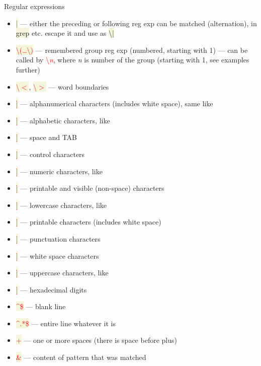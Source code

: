 \documentclass[compress, xelatex, 11pt, xcolor=svgnames, aspectratio=169, url={hyphens, lowtilde}]{beamer}
\renewcommand{\texttt}[1]{\colorbox{Beige}{{\ttfamily #1}}}
\renewcommand{\alert}[1]{\textcolor{red}{#1}}
\begin{document}
\begin{frame}[allowframebreaks]{Regular expressions}
\begin{itemize}
		\item \alert{\texttt{|}} --- either the preceding or following reg exp can be matched (alternation), in \texttt{grep} etc. escape it and use as \texttt{\textbackslash |}
		\item \alert{\texttt{\textbackslash(\ldots\textbackslash)}} --- remembered group reg exp (numbered, starting with 1) --- can be called by \alert{\textbackslash\textit{n}}, where \textit{n} is number of the group (starting with 1, see examples further)
		\item \alert{\texttt{\textbackslash$<$}}, \alert{\texttt{\textbackslash$>$}} --- word boundaries
		\item \alert{\texttt{[[:alnum:]]}} --- alphanumerical characters (includes white space), same like \texttt{[a-zA-Z0-9]}
		\item \alert{\texttt{[[:alpha:]]}} --- alphabetic characters, like \texttt{[a-zA-Z]}
		\item \alert{\texttt{[[:blank:]]}} --- space and TAB
		\item \alert{\texttt{[[:cntrl:]]}} --- control characters
		\item \alert{\texttt{[[:digit:]]}} --- numeric characters, like \texttt{[0-9]}
		\item \alert{\texttt{[[:graph:]]}} --- printable and visible (non-space) characters
		\item \alert{\texttt{[[:lower:]]}} --- lowercase characters, like \texttt{[a-z]}
		\item \alert{\texttt{[[:print:]]}} --- printable characters (includes white space)
		\item \alert{\texttt{[[:punct:]]}} --- punctuation characters
		\item \alert{\texttt{[[:space:]]}} --- white space characters
		\item \alert{\texttt{[[:upper:]]}} --- uppercase characters, like \texttt{[A-Z]}
		\item \alert{\texttt{[[:xdigit:]]}} --- hexadecimal digits
		\item \alert{\texttt{\textasciicircum\$}} --- blank line
		\item \alert{\texttt{\textasciicircum.*\$}} --- entire line whatever it is
		\item \alert{\texttt{ +}} --- one or more spaces (there is space before plus)
		\item \alert{\texttt{\&}} --- content of pattern that was matched
	\end{itemize}
\end{frame}
\end{document}
